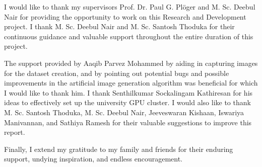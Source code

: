 \documentclass[rnd]{mas_report}
\begin{document}
\begin{acknowledgements}
I would like to thank my supervisors Prof. Dr. Paul G. Pl\"oger and M. Sc. Deebul Nair for providing the opportunity to work on this Research and Development project. I thank M. Sc. Deebul Nair and M. Sc. Santosh Thoduka for their continuous guidance and valuable support throughout the entire duration of this project.

The support provided by Aaqib Parvez Mohammed by aiding in capturing images for the dataset creation, and by pointing out potential bugs and possible improvements in the artificial image generation algorithm was beneficial for which I would like to thank him. I thank Senthilkumar Sockalingam Kathiresan for his ideas to effectively set up the university GPU cluster. I would also like to thank M. Sc. Santosh Thoduka, M. Sc. Deebul Nair, Jeeveswaran Kishaan, Iswariya Manivannan, and Sathiya Ramesh for their valuable suggestions to improve this report.

Finally, I extend my gratitude to my family and friends for their enduring support, undying inspiration, and endless encouragement.
\end{acknowledgements}


\tableofcontents


\mainmatter %

\pagestyle{mainmatter}










\begin{appendices}


\end{appendices}

\backmatter

\end{document}
